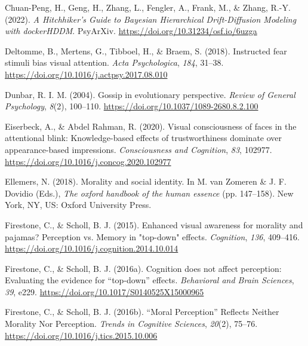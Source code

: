 \documentclass[
  man]{apa6}
\newlength{\cslhangindent}
\newlength{\cslentryspacingunit} %
\newenvironment{CSLReferences}[2] %
 {%
  \setlength{\parindent}{0pt}
  \ifodd #1
  \let\oldpar\par
  \def\par{\hangindent=\cslhangindent\oldpar}
  \fi
  \setlength{\parskip}{#2\cslentryspacingunit}
 }%
 {}
\begin{document}
\begin{CSLReferences}{1}{0}
\leavevmode{}%
Chuan-Peng, H., Geng, H., Zhang, L., Fengler, A., Frank, M., \& Zhang, R.-Y. (2022). \emph{A {Hitchhiker}'s {Guide} to {Bayesian} {Hierarchical} {Drift}-{Diffusion} {Modeling} with {dockerHDDM}}. PsyArXiv. \url{https://doi.org/10.31234/osf.io/6uzga}

\leavevmode{}%
Deltomme, B., Mertens, G., Tibboel, H., \& Braem, S. (2018). Instructed fear stimuli bias visual attention. \emph{Acta Psychologica}, \emph{184}, 31--38. \url{https://doi.org/10.1016/j.actpsy.2017.08.010}

\leavevmode{}%
Dunbar, R. I. M. (2004). Gossip in evolutionary perspective. \emph{Review of General Psychology}, \emph{8}(2), 100--110. \url{https://doi.org/10.1037/1089-2680.8.2.100}

\leavevmode{}%
Eiserbeck, A., \& Abdel Rahman, R. (2020). Visual consciousness of faces in the attentional blink: Knowledge-based effects of trustworthiness dominate over appearance-based impressions. \emph{Consciousness and Cognition}, \emph{83}, 102977. \url{https://doi.org/10.1016/j.concog.2020.102977}

\leavevmode{}%
Ellemers, N. (2018). Morality and social identity. In M. van Zomeren \& J. F. Dovidio (Eds.), \emph{The oxford handbook of the human essence} (pp. 147--158). New York, {NY}, {US}: Oxford University Press.

\leavevmode{}%
Firestone, C., \& Scholl, B. J. (2015). Enhanced visual awareness for morality and pajamas? Perception vs. Memory in "top-down" effects. \emph{Cognition}, \emph{136}, 409--416. \url{https://doi.org/10.1016/j.cognition.2014.10.014}

\leavevmode{}%
Firestone, C., \& Scholl, B. J. (2016a). Cognition does not affect perception: {Evaluating} the evidence for {``top-down''} effects. \emph{Behavioral and Brain Sciences}, \emph{39}, e229. \url{https://doi.org/10.1017/S0140525X15000965}

\leavevmode{}%
Firestone, C., \& Scholl, B. J. (2016b). {``{Moral} {Perception}''} {Reflects} {Neither} {Morality} {Nor} {Perception}. \emph{Trends in Cognitive Sciences}, \emph{20}(2), 75--76. \url{https://doi.org/10.1016/j.tics.2015.10.006}


\end{CSLReferences}
\end{document}
